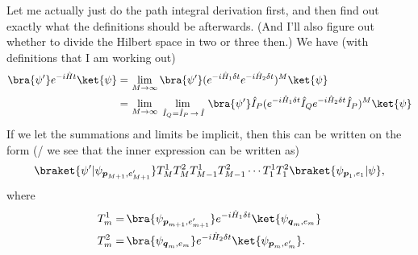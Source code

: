 \documentclass{report}
\begin{document}
Let me actually just do the path integral derivation first, and then find out exactly what the definitions should be afterwards. (And I'll also figure out whether to divide the Hilbert space in two or three then.) We have (with definitions that I am working out)
\begin{align}
\begin{aligned}
	\bra{\psi'} e^{-i \hat H t} \ket{\psi}
	=&\,
	\lim_{M \to \infty}
		\bra{\psi'} (
			e^{-i  \hat H_{1} \delta t}
			e^{-i  \hat H_{2} \delta t}
		)^M
		\ket{\psi}
	\\=&\,
	\lim_{M \to \infty} \lim_{\,\,\hat I_Q = \hat I_P\, \to\, \hat I\,}
		\bra{\psi'} \hat I_P (
			e^{-i  \hat H_{1} \delta t}
			\hat I_Q
			e^{-i  \hat H_{2} \delta t}
			\hat I_P
		)^M
		\ket{\psi}
\end{aligned}
\end{align} 
If we let the summations and limits be implicit, then this can be written on the form (/ we see that the inner expression can be written as) %
\begin{align}
\begin{aligned}
	\braket{\psi' | \psi_{\boldsymbol{p}_{M+1}, e_{M+1}'}} 
			T^1_{M}T^2_{M} T^1_{M-1}T^2_{M-1} \cdots T^1_{1}T^2_{1}
		\braket{\psi_{\boldsymbol{p}_{1}, e_{1}} | \psi},
\end{aligned}
\end{align} 
where 
\begin{align}
\begin{aligned}
	T^1_{m} =&\,
		\bra{\psi_{\boldsymbol{p}_{m+1}, e_{m+1}'}}
			e^{-i  \hat H_{1} \delta t}
		\ket{\psi_{\boldsymbol{q}_{m}, e_{m}}} \\
	T^2_{m} =&\,
		\bra{\psi_{\boldsymbol{q}_{m}, e_{m}}}
			e^{-i  \hat H_{2} \delta t}
		\ket{\psi_{\boldsymbol{p}_{m}, e_{m}'}}.
\end{aligned}
\end{align} 
\end{document}
